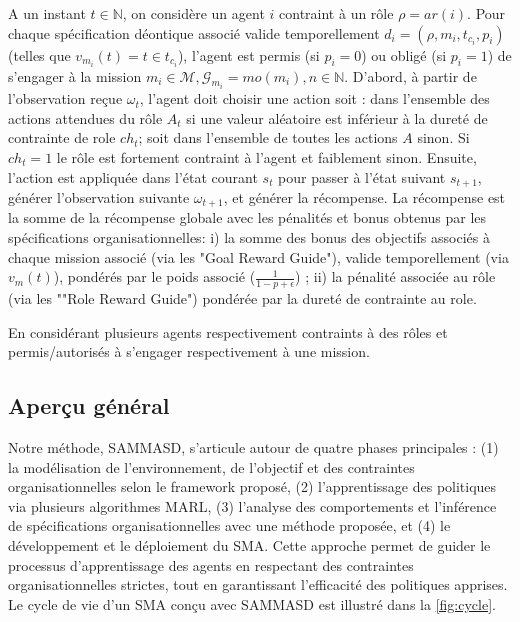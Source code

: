 \documentclass[sigconf,anonymous]{aamas}
\begin{document}
A un instant $t \in \mathbb{N}$, on considère un agent $i$ contraint à un rôle $\rho = ar(i)$. Pour chaque spécification déontique associé valide temporellement $d_i = (\rho,m_i,t_{c_i},p_i)$ (telles que $v_{m_i}(t) = t \in t_{c_i}$), l'agent est permis (si $p_i = 0$) ou obligé (si $p_i = 1$) de s'engager à la mission $m_i \in \mathcal{M}, \mathcal{G}_{m_i} = mo(m_i), n \in \mathbb{N}$.
%
D'abord, à partir de l'observation reçue $\omega_t$, l'agent doit choisir une action soit : dans l'ensemble des actions attendues du rôle $A_t$ si une valeur aléatoire est inférieur à la dureté de contrainte de role $ch_t$; soit dans l'ensemble de toutes les actions $A$ sinon. Si $ch_t = 1$ le rôle est fortement contraint à l'agent et faiblement sinon.
%
Ensuite, l'action est appliquée dans l'état courant $s_t$ pour passer à l'état suivant $s_{t+1}$, générer l'observation suivante $\omega_{t+1}$, et générer la récompense. La récompense est la somme de la récompense globale avec les pénalités et bonus obtenus par les spécifications organisationnelles: \quad i) la somme des bonus des objectifs associés à chaque mission associé (via les "Goal Reward Guide"), valide temporellement (via $v_m(t)$), pondérés par le poids associé ($\frac{1}{1-p+\epsilon}$) ; \quad ii) la pénalité associée au rôle (via les ""Role Reward Guide") pondérée par la dureté de contrainte au role.

En considérant plusieurs agents respectivement contraints à des rôles et permis/autorisés à s'engager respectivement à une mission.


\subsection{Aperçu général}

Notre méthode, SAMMASD, s'articule autour de quatre phases principales : (1) la modélisation de l'environnement, de l'objectif et des contraintes organisationnelles selon le framework proposé, (2) l'apprentissage des politiques via plusieurs algorithmes MARL, (3) l'analyse des comportements et l'inférence de spécifications organisationnelles avec une méthode proposée, et (4) le développement et le déploiement du SMA. Cette approche permet de guider le processus d'apprentissage des agents en respectant des contraintes organisationnelles strictes, tout en garantissant l'efficacité des politiques apprises. Le cycle de vie d'un SMA conçu avec SAMMASD est illustré dans la \autoref{fig:cycle}.

\end{document}
